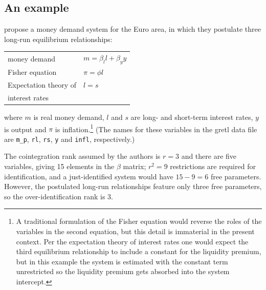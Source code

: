 \subsection{An example}
\label{sec:vecm-overid-ex}

\cite{brand-cassola04} propose a money demand system for the Euro
area, in which they postulate three long-run equilibrium
relationships:
%
\begin{center}
\begin{tabular}{ll}
  money demand & $m = \beta_l l + \beta_y y$ \\
  Fisher equation & $\pi = \phi l$ \\
  Expectation theory of & $l = s$ \\ [-4pt]
  interest rates
\end{tabular}
\end{center}
%
where $m$ is real money demand, $l$ and $s$ are long- and short-term
interest rates, $y$ is output and $\pi$ is inflation.\footnote{A
traditional formulation of the Fisher equation would reverse the roles
of the variables in the second equation, but this detail is immaterial
in the present context. Per the expectation theory of interest rates
one would expect the third equilibrium relationship to include a
constant for the liquidity premium, but in this example the system is
estimated with the constant term unrestricted so the liquidity premium
gets absorbed into the system intercept.}  (The names for these
variables in the gretl data file are \verb|m_p|, \texttt{rl},
\texttt{rs}, \texttt{y} and \texttt{infl}, respectively.)

The cointegration rank assumed by the authors is $r=3$ and there are
five variables, giving 15 elements in the $\beta$ matrix; $r^2 = 9$
restrictions are required for identification, and a just-identified
system would have $15 - 9 = 6$ free parameters.  However, the
postulated long-run relationships feature only three free parameters,
so the over-identification rank is 3.

